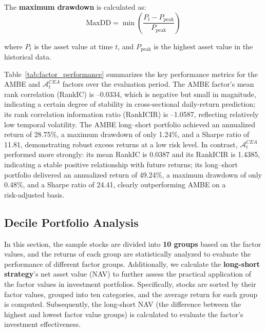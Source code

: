 \documentclass[preprint,12pt,authoryear]{elsarticle}
\begin{document}
The \textbf{maximum drawdown} is calculated as:
\begin{equation}
    \text{MaxDD} = \min \left( \frac{P_t - P_{\text{peak}}}{P_{\text{peak}}} \right)
\end{equation}

where \(P_t\) is the asset value at time \(t\), and \(P_{\text{peak}}\) is the highest asset value in the historical data.

Table~\ref{tab:factor_performance} summarizes the key performance metrics for the AMBE and \(\mathcal{A}^{CEA}_t\) factors over the evaluation period.
The AMBE factor's mean rank correlation (RankIC) is –0.0334, which is negative but small in magnitude, indicating a certain degree of stability in cross‑sectional daily‑return prediction; its rank correlation information ratio (RankICIR) is –1.0587, reflecting relatively low temporal volatility. The AMBE long–short portfolio achieved an annualized return of 28.75\%, a maximum drawdown of only 1.24\%, and a Sharpe ratio of 11.81, demonstrating robust excess returns at a low risk level.
In contrast, \(\mathcal{A}^{CEA}_t\) performed more strongly: its mean RankIC is 0.0387 and its RankICIR is 1.4385, indicating a stable positive relationship with future returns; its long–short portfolio delivered an annualized return of 49.24\%, a maximum drawdown of only 0.48\%, and a Sharpe ratio of 24.41, clearly outperforming AMBE on a risk‑adjusted basis.

\begin{table}[ht]
  \centering
  \caption{Summary of Factor Performance Metrics}
  \label{tab:factor_performance}
\end{table}

\subsection{ Decile Portfolio Analysis}
In this section, the sample stocks are divided into \textbf{10 groups} based on the factor values, and the returns of each group are statistically analyzed to evaluate the performance of different factor groups. Additionally, we calculate the \textbf{long-short strategy}'s net asset value (NAV) to further assess the practical application of the factor values in investment portfolios. Specifically, stocks are sorted by their factor values, grouped into ten categories, and the average return for each group is computed. Subsequently, the long-short NAV (the difference between the highest and lowest factor value groups) is calculated to evaluate the factor's investment effectiveness.
\end{document}
